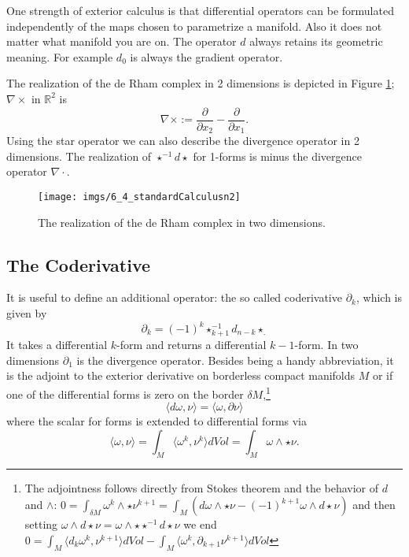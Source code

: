 One strength of exterior calculus is that differential operators can be formulated independently of the maps chosen to parametrize a manifold. Also it does not matter what manifold you are on. The operator $d$ always retains its geometric meaning. For example $d_0$ is always the gradient operator.

The realization of the de Rham complex in 2 dimensions is depicted in Figure \ref{fig:deRham2d}; $\nabla \times$ in $\mathbb R^2$ is
\[\nabla \times := \frac{\partial}{\partial x_2} - \frac{\partial}{\partial x_1}.\] 
Using the star operator we can also describe the divergence operator in 2 dimensions. The realization of $\star^{-1} d \star$ for 1-forms is minus the divergence operator $\nabla\cdot$.

\begin{figure}
\begin{center}
\texttt{[image: imgs/6\_4\_standardCalculusn2]}
\end{center}
\caption{The realization of the de Rham complex in two dimensions.}
\label{fig:deRham2d}
\end{figure}

\subsection{The Coderivative}
\label{subsec::coderivativ}
It is useful to define an additional operator: the so called coderivative $\partial_k$, which is given by
\[\partial_k = (-1)^{k}\star^{-1}_{k+1}d_{n-k}\star_.\]
It takes a differential $k$-form and returns a differential $k-1$-form. In two dimensions $\partial_1$ is the divergence operator. Besides being a handy abbreviation, it is the adjoint to the exterior derivative on borderless compact manifolds $M$ or if one of the differential forms is zero on the border $\delta M$,\footnote{The adjointness follows directly from Stokes theorem and the behavior of $d$ and $\wedge$: $0=\int_{\delta M} \omega^k\wedge \star \nu^{k+1} = \int_M (d\omega\wedge\star \nu - (-1)^{k+1}\omega\wedge d\star \nu)$ and then setting $\omega\wedge d\star\nu = \omega\wedge \star \star^{-1} d\star\nu$ we end $0= \int_M \langle d_k\omega^k,\nu^{k+1}\rangle dVol  - \int_M \langle \omega^k,\partial_{k+1}\nu^{k+1} \rangle dVol$}
\begin{equation}\langle d\omega, \nu\rangle = \langle \omega , \partial \nu \rangle \end{equation}
where the scalar for forms is extended to differential forms via
\[\langle \omega, \nu \rangle = \int_{M} \langle\omega^k,\nu^k\rangle dVol = \int_{M} \omega \wedge \star \nu.\]

